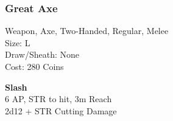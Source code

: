 \subsubsection{Great Axe}\label{weapon:greatAxe}
Weapon, Axe, Two-Handed, Regular, Melee\\
Size: L\\
Draw/Sheath: None\\
Cost: 280 Coins

\textbf{Slash}\\
6 AP, STR to hit, 3m Reach\\
2d12 + \texttimes STR Cutting Damage
